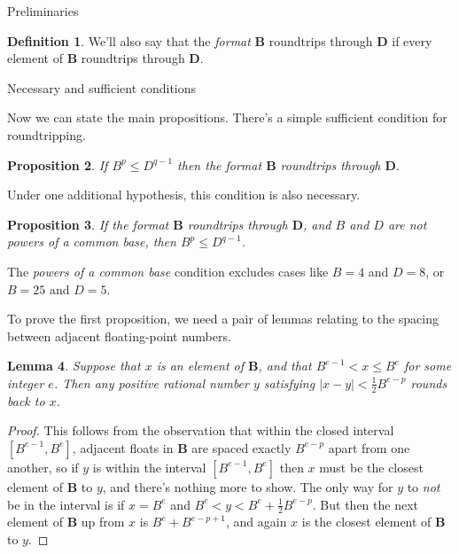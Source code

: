 \documentclass{article}
\theoremstyle{plain}
\newtheorem{lemma}{Lemma}
\newtheorem{proposition}[lemma]{Proposition}
\theoremstyle{definition}
\newtheorem{definition}[lemma]{Definition}
\begin{document}
\begin{section}{Preliminaries}
\begin{definition}
  We'll also say that the \emph{format} $\mathbf B$ roundtrips through $\mathbf
  D$ if every element of $\mathbf B$ roundtrips through $\mathbf D$.
\end{definition}

\end{section}

\begin{section}{Necessary and sufficient conditions}

Now we can state the main propositions. There's a simple sufficient condition
for roundtripping.

\begin{proposition}
  \label{roundtrip_sufficient_condition}
  If $B^p \le D^{q-1}$ then the format $\mathbf B$ roundtrips through $\mathbf
  D$.
\end{proposition}

Under one additional hypothesis, this condition is also necessary.

\begin{proposition}
  \label{roundtrip_necessary_condition}
  If the format $\mathbf B$ roundtrips through $\mathbf D$, \emph{and} $B$ and
  $D$ are not powers of a common base, then $B^p \le D^{q-1}$.
\end{proposition}

The \emph{powers of a common base} condition excludes cases like $B = 4$ and $D
= 8$, or $B = 25$ and $D = 5$.

To prove the first proposition, we need a pair of lemmas relating to the
spacing between adjacent floating-point numbers.

\begin{lemma}
  \label{close_implies_round}
  Suppose that $x$ is an element of $\mathbf B$, and that $B^{e-1} < x \le B^e$
  for some integer $e$. Then any positive rational number $y$ satisfying $|x -
  y| < \frac12 B^{e-p}$ rounds back to $x$.
\end{lemma}

\begin{proof}
  This follows from the observation that within the closed interval $[B^{e-1},
    B^e]$, adjacent floats in $\mathbf B$ are spaced exactly $B^{e-p}$ apart
  from one another, so if $y$ is within the interval $[B^{e-1}, B^e]$ then $x$
  must be the closest element of $\mathbf B$ to $y$, and there's nothing more
  to show. The only way for $y$ to \emph{not} be in the interval is if $x=B^e$
  and $B^e < y < B^e + \frac12 B^{e-p}$. But then the next element of $\mathbf
  B$ up from $x$ is $B^e + B^{e-p+1}$, and again $x$ is the closest element
  of $\mathbf B$ to $y$.
\end{proof}


\end{section}
\end{document}
